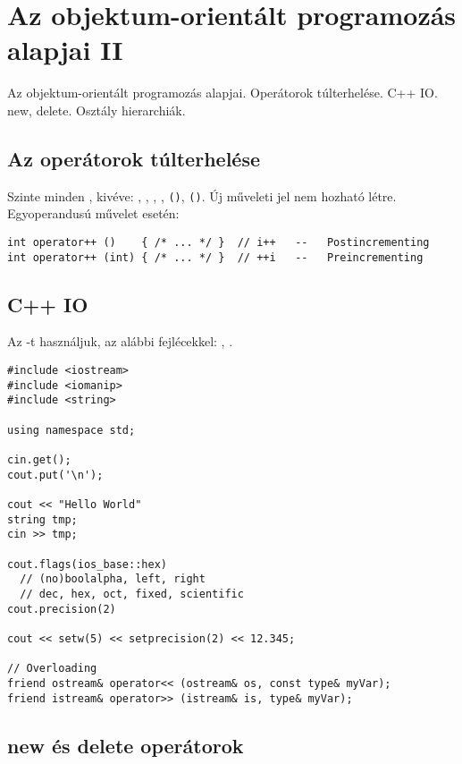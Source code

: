 \documentclass[../../main.tex]{subfiles}
\begin{document}
\section{Az objektum-orientált programozás alapjai II}

\begin{fulltheorem}
  Az objektum-orientált programozás alapjai. Operátorok túlterhelése.
  C++ IO. new, delete. Osztály hierarchiák.
\end{fulltheorem}

\subsection{Az operátorok túlterhelése}

Szinte minden  , kivéve: \tc{::}, ,
, , \texttt{()}, \texttt{()}. Új műveleti
jel nem hozható létre. Egyoperandusú művelet esetén:

\begin{verbatim}
int operator++ ()    { /* ... */ }  // i++   --   Postincrementing
int operator++ (int) { /* ... */ }  // ++i   --   Preincrementing
\end{verbatim}

\subsection{C++ IO}

Az  -t használjuk, az alábbi fejlécekkel:
, .

\begin{verbatim}
#include <iostream>
#include <iomanip>
#include <string>

using namespace std;

cin.get();
cout.put('\n');

cout << "Hello World"
string tmp;
cin >> tmp;

cout.flags(ios_base::hex)
  // (no)boolalpha, left, right
  // dec, hex, oct, fixed, scientific
cout.precision(2)

cout << setw(5) << setprecision(2) << 12.345;

// Overloading
friend ostream& operator<< (ostream& os, const type& myVar);
friend istream& operator>> (istream& is, type& myVar);
\end{verbatim}

\subsection{new és delete operátorok}
\end{document}
